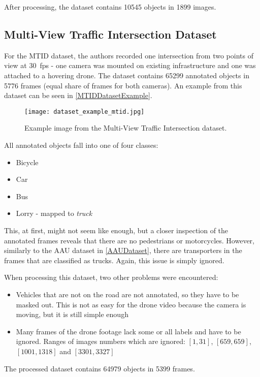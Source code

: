 After processing, the dataset contains \num{10545} objects in \num{1899} images.


\subsection{Multi-View Traffic Intersection Dataset}

For the MTID dataset, the authors \cite{Jensen2020} recorded one intersection
from two points of view at \SI{30}{fps} - one camera was mounted on existing
infrastructure and one was attached to a hovering drone. The dataset contains
\num{65299} annotated objects in \num{5776} frames (equal share of frames for
both cameras). An example from this dataset can be seen in
\autoref{MTIDDatasetExample}.

\begin{figure}[h]
    \centering
    \texttt{[image: dataset\_example\_mtid.jpg]}
    \caption{Example image from the Multi-View Traffic Intersection dataset.}
    \label{MTIDDatasetExample}
\end{figure}

All annotated objects fall into one of four classes:
\begin{itemize}
    \item Bicycle
    \item Car
    \item Bus
    \item Lorry - mapped to \textit{truck}
\end{itemize}
This, at first, might not seem like enough, but a closer inspection of the
annotated frames reveals that there are no pedestrians or motorcycles. However,
similarly to the AAU dataset in \autoref{AAUDataset}, there are transporters in the frames
that are classified as trucks. Again, this issue is simply ignored.

When processing this dataset, two other problems were encountered:
\begin{itemize}
    \item Vehicles that are not on the road are not annotated, so they have to
    be masked out. This is not as easy for the drone video because the camera is
    moving, but it is still simple enough
    \item Many frames of the drone footage lack some or all labels and have to
    be ignored. Ranges of images numbers which are ignored: $[1,31]$,
    $[659,659]$, $[1001,1318]$ and $[3301,3327]$
\end{itemize}
The processed dataset contains \num{64979} objects in \num{5399} frames.


